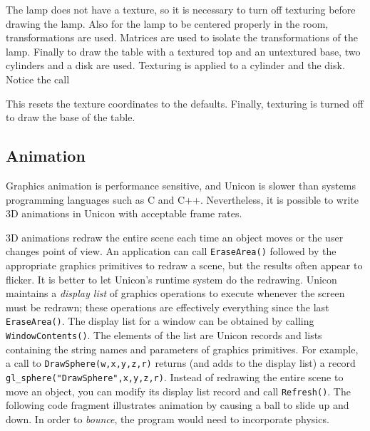 The lamp does not have a texture, so it is necessary to turn off
texturing before drawing the lamp. Also for the lamp to be centered
properly in the room, transformations are used. Matrices are used to
isolate the transformations of the lamp. Finally to draw the table
with a textured top and an untextured base, two cylinders and a disk
are used. Texturing is applied to a cylinder and the disk.  Notice the
call


\noindent
This resets the texture coordinates to the defaults. Finally, texturing
is turned off to draw the base of the table.

\subsection*{Animation}

Graphics animation is performance sensitive, and Unicon is slower than
systems programming languages such as C and C++. Nevertheless, it is
possible to write 3D animations in Unicon with acceptable frame rates.

3D animations redraw the entire scene each time an object moves or the
user changes point of view. An application can call
\texttt{EraseArea()} followed by the appropriate graphics primitives
to redraw a scene, but the results often appear to flicker. It is
better to let Unicon's runtime system do the redrawing. Unicon
maintains a \textit{display list} of graphics operations to execute
whenever the screen must be redrawn; these operations are effectively
everything since the last \texttt{EraseArea()}. The display list for a
window can be obtained by calling \texttt{WindowContents()}. The
elements of the list are Unicon records and lists containing the
string names and parameters of graphics primitives. For example, a
call to \texttt{DrawSphere(w,x,y,z,r)} returns (and adds to the
display list) a record \texttt{gl\_sphere("DrawSphere",x,y,z,r)}.
Instead of redrawing the entire scene to move an object, you can
modify its display list record and call \texttt{Refresh()}. The
following code fragment illustrates animation by causing a ball to
slide up and down.  In order to \textit{bounce}, the program would
need to incorporate physics.


